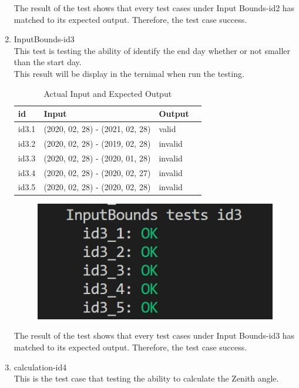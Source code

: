 \documentclass[12pt, titlepage]{article}
\begin{document}
\begin{enumerate}
The result of the test shows that every test cases under Input Bounds-id2 has matched to its expected output. Therefore, the test case success.

\item{InputBounds-id3\\} 
This test is testing the ability of identify the end day whether or not smaller than the start day.\\
This result will be display in the ternimal when run the testing.



\begin{table}[h!]
\centering
\noindent \begin{tabular}{l l l l} 
    \toprule		
    \textbf{id} & \textbf{Input} & \textbf{Output}\\ 
	\midrule
    id3.1 & (2020, 02, 28) - (2021, 02, 28) & valid\\
   id3.2 & (2020, 02, 28) - (2019, 02, 28)  & invalid\\
   id3.3 & (2020, 02, 28) - (2020, 01, 28)  & invalid\\
   id3.4 & (2020, 02, 28) - (2020, 02, 27)  & invalid\\
   id3.5 & (2020, 02, 28) - (2020, 02, 28)  & invalid\\
    \bottomrule
  \end{tabular}
\caption{Actual Input and Expected Output}
\end{table}



\begin{figure}[hbt!]
 \centering
 \includegraphics[scale=.5]{InputBounds-id3}
\end{figure}

The result of the test shows that every test cases under Input Bounds-id3 has matched to its expected output. Therefore, the test case success.


\item{calculation-id4\\} 
This is the test case that testing the ability to calculate the Zenith angle.


\end{enumerate}
\end{document}
